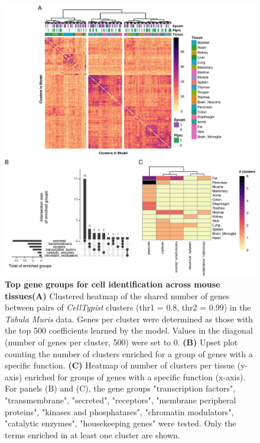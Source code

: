 \begin{figure}[pht!]
    \centering
    \includegraphics[scale=0.835]{Chapter4/Figs/chap4_genesAnalysis_mouse.png} %
    \caption[Top gene groups for cell identification across mouse tissues]{\textbf{Top gene groups for cell identification across mouse tissues}\newline\textbf{(A)} Clustered heatmap of the shared number of genes between pairs of \textit{CellTypist} clusters (thr1 = 0.8, thr2 = 0.99) in the \textit{Tabula Muris} data. Genes per cluster were determined as those with the top 500 coefficients learned by the model. Values in the diagonal (number of genes per cluster, 500) were set to 0. \textbf{(B)} Upset plot counting the number of clusters enriched for a group of genes with a specific function. \textbf{(C)} Heatmap of number of clusters per tissue (y-axis) enriched for groups of genes with a specific function (x-axis). For panels (B) and (C), the gene groups "transcription factors", "transmembrane", "secreted", "receptors", "membrane peripheral proteins", "kinases and phosphatases", "chromatin modulators", "catalytic enzymes", "housekeeping genes" were tested. Only the terms enriched in at least one cluster are shown.}
    \label{fig:chap4_genetypes_mouse}
\end{figure}

